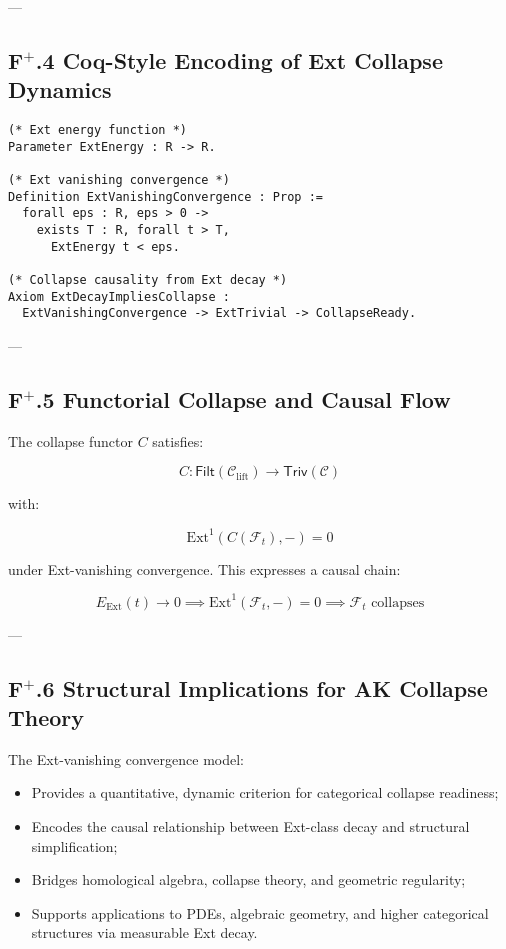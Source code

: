 \documentclass[11pt]{article}
\begin{document}
---

\subsection*{F$^{+}$.4 Coq-Style Encoding of Ext Collapse Dynamics}

\begin{lstlisting}[language=Coq]
(* Ext energy function *)
Parameter ExtEnergy : R -> R.

(* Ext vanishing convergence *)
Definition ExtVanishingConvergence : Prop :=
  forall eps : R, eps > 0 ->
    exists T : R, forall t > T,
      ExtEnergy t < eps.

(* Collapse causality from Ext decay *)
Axiom ExtDecayImpliesCollapse :
  ExtVanishingConvergence -> ExtTrivial -> CollapseReady.
\end{lstlisting}

---

\subsection*{F$^{+}$.5 Functorial Collapse and Causal Flow}

The collapse functor $C$ satisfies:

\[
C : \mathsf{Filt}(\mathcal{C}_{\mathrm{lift}}) \longrightarrow \mathsf{Triv}(\mathcal{C})
\]

with:

\[
\mathrm{Ext}^1(C(\mathcal{F}_t), -) = 0
\]

under Ext-vanishing convergence. This expresses a causal chain:

\[
E_{\mathrm{Ext}}(t) \to 0 \implies \mathrm{Ext}^1(\mathcal{F}_t, -) = 0 \implies \mathcal{F}_t \text{ collapses}
\]

---

\subsection*{F$^{+}$.6 Structural Implications for AK Collapse Theory}

The Ext-vanishing convergence model:

\begin{itemize}
    \item Provides a quantitative, dynamic criterion for categorical collapse readiness;
    \item Encodes the causal relationship between Ext-class decay and structural simplification;
    \item Bridges homological algebra, collapse theory, and geometric regularity;
    \item Supports applications to PDEs, algebraic geometry, and higher categorical structures via measurable Ext decay.
\end{itemize}
\end{document}
